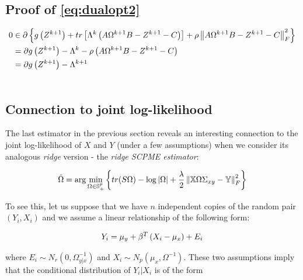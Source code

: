 \documentclass[11pt,]{report}
\begin{document}
\hypertarget{proofdualopt2}{%
\subsection{Proof of \eqref{eq:dualopt2}}\label{proofdualopt2}}

\begin{equation}
\begin{split}
  0 &\in \partial \left\{ g\left(Z^{k + 1}\right) + tr\left[ \Lambda^{k}\left( A\Omega^{k + 1}B - Z^{k + 1} - C \right) \right] + \rho\left\| A\Omega^{k + 1}B - Z^{k + 1} - C \right\|_{F}^{2} \right\} \\
  &= \partial g\left(Z^{k + 1}\right) - \Lambda^{k} - \rho\left(A\Omega^{k + 1}B - Z^{k + 1} - C \right) \\
  &= \partial g\left(Z^{k + 1}\right) - \Lambda^{k + 1} \\
\label{eq:appendixdualopt2}\notag
\end{split}
\end{equation}

\hypertarget{connection-to-joint-log-likelihood}{%
\subsection{Connection to joint log-likelihood}\label{connection-to-joint-log-likelihood}}

The last estimator in the previous section reveals an interesting connection to the joint log-likelihood of \(X\) and \(Y\) (under a few assumptions) when we consider its analogous \emph{ridge} version - the \emph{ridge SCPME estimator}:

\begin{equation}
\hat{\Omega} = \arg\min_{\Omega \in \mathbb{S}_{+}^{p}}\left\{ tr(S\Omega) - \log\left| \Omega \right| + \frac{\lambda}{2}\left\| \mathbb{X}\Omega \Sigma_{xy} - \mathbb{Y} \right\|_{F}^{2} \right\}
\label{eq:penregression}\notag
\end{equation}

To see this, let us suppose that we have \(n\) independent copies of the random pair \((Y_{i}, X_{i})\) and we assume a linear relationship of the following form:

\begin{equation}
Y_{i} = \mu_{y} + \beta^{T}\left(X_{i} - \mu_{x}\right) + E_{i}
\label{eq:linregression}\notag
\end{equation}

where \(E_{i} \sim N_{r}\left( 0, \Omega_{y | x}^{-1} \right)\) and \(X_{i} \sim N_{p}\left( \mu_{x}, \Omega^{-1} \right)\). These two assumptions imply that the conditional distribution of \(Y_{i}|X_{i}\) is of the form
\end{document}
